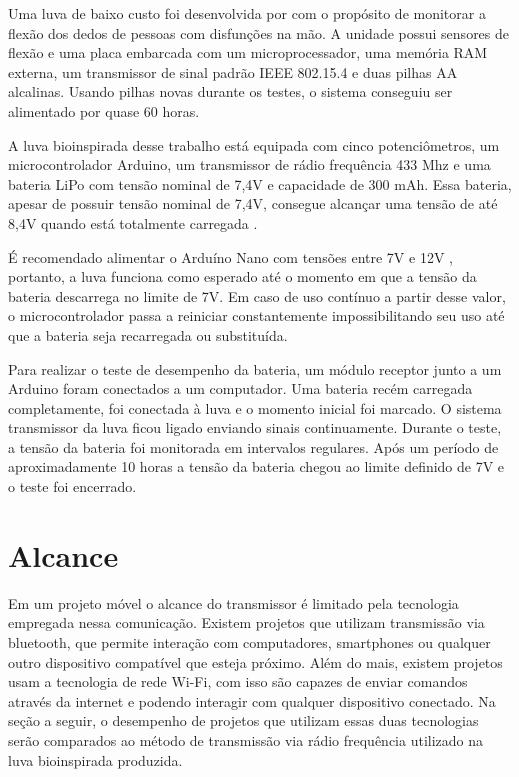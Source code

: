 \documentclass[
	12pt,				%
	openright,			%
	oneside,			%
	a4paper,			%
	english,			%
	brazil				%
	]{abntex2}
\begin{document}
			Uma luva de baixo custo foi desenvolvida por \cite{simone2007lowcost} com o propósito de monitorar a flexão dos dedos de pessoas com disfunções na mão. A unidade possui sensores de flexão e uma placa embarcada com um microprocessador, uma memória RAM externa, um transmissor de sinal padrão IEEE 802.15.4 e duas pilhas AA alcalinas. Usando pilhas novas durante os testes, o sistema conseguiu ser alimentado por quase 60 horas.

			A luva bioinspirada desse trabalho está equipada com cinco potenciômetros, um microcontrolador Arduino, um transmissor de rádio frequência 433 Mhz e uma bateria LiPo com tensão nominal de 7,4V e capacidade de 300 mAh. Essa bateria, apesar de possuir tensão nominal de 7,4V, consegue alcançar uma tensão de até 8,4V quando está totalmente carregada \cite{buchmann2016batteries}.

			É recomendado alimentar o Arduíno Nano com tensões entre 7V e 12V \cite{arduinopowerrange}, portanto, a luva funciona como esperado até o momento em que a tensão da bateria descarrega no limite de 7V. Em caso de uso contínuo a partir desse valor, o microcontrolador passa a reiniciar constantemente impossibilitando seu uso até que a bateria seja recarregada ou substituída.

			Para realizar o teste de desempenho da bateria, um módulo receptor junto a um Arduino foram conectados a um computador. Uma bateria recém carregada completamente, foi conectada à luva e o momento inicial foi marcado. O sistema transmissor da luva ficou ligado enviando sinais continuamente. Durante o teste, a tensão da bateria foi monitorada em intervalos regulares. Após um período de aproximadamente 10 horas a tensão da bateria chegou ao limite definido de 7V e o teste foi encerrado.


			\section{Alcance}

			Em um projeto móvel o alcance do transmissor é limitado pela tecnologia empregada nessa comunicação. Existem projetos que utilizam transmissão via bluetooth, que permite interação com computadores, smartphones ou qualquer outro dispositivo compatível que esteja próximo. Além do mais, existem projetos usam a tecnologia de rede Wi-Fi, com isso são capazes de enviar comandos através da internet e podendo interagir com qualquer dispositivo conectado. 
			Na seção a seguir, o desempenho de projetos que utilizam essas duas tecnologias serão comparados ao método de transmissão via rádio frequência utilizado na luva bioinspirada produzida.
\end{document}
